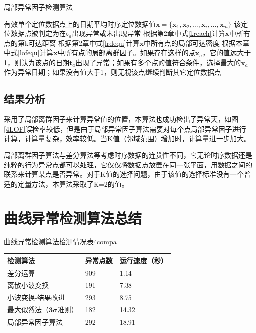 \documentclass[a4paper,AutoFakeBold,oneside,12pt]{book}
\begin{document}
\begin{algorithm} 
\caption{局部异常因子检测算法} 
\label{a44}
\renewcommand{\algorithmicrequire}{\textbf{输入：}}
\renewcommand{\algorithmicensure}{\textbf{输出：}} 
\begin{algorithmic}[1] 
\Require 有效单个定位数据点上的日期平均时序定位数据值$\bm{x}=\{\bm{x}_1,\bm{x}_2,\ldots,\bm{x}_i,\ldots,\bm{x}_m\}$
\Ensure 该定位数据点被判定为在$\bm{t}_a$出现异常或未出现异常
\State  根据第2章中式\ref{kreach}计算$\bm{x}$中所有点的第k可达距离
\State  根据第2章中式\ref{lrdequ}计算$\bm{x}$中所有点的局部可达密度
\State 根据本章中式\ref{lofequ}计算$\bm{x}$中所有点的局部离群因子。如果存在这样的点$\bm{x}_a$，它的值远大于1，则认为该点的日期$\bm{t}_a$出现了异常；如果有多个点的值符合条件，选择最大的$\bm{x}_a$作为异常日期；如果没有值大于1，则无视该点继续判断其它定位数据点
\end{algorithmic}  
\end{algorithm}


\subsection{结果分析}
采用了局部离群因子来计算异常值的位置，本算法也成功检出了异常天，如图\ref{4LOF}误检率较低，但是由于局部异常因子算法需要对每个点局部异常因子进行计算，计算量复杂，效率较低。当K值（邻域范围）增加时，计算量进一步加大。


局部离群因子算法与差分算法等考虑时序数据的连贯性不同，它无论时序数据还是纯粹的行为异常点都可以处理，它仅仅将数据点放置在同一张平面，用数据之间的联系来计算某点是否异常。对于K值的选择问题，由于该值的选择标准没有一个普适的定量方法，本算法采取了K=2的值\cite{KNNK}。


\section{曲线异常检测算法总结}


\begin{bupttable}{曲线异常检测算法检测情况表}{4compa}
    \begin{tabular}{l|l|l}
		\hline \textbf{检测算法} & \textbf{异常点数}  & \textbf{运行速度（秒）} \\
		\hline 差分运算 & 909 & 1.14\\
		\hline 离散小波变换 & 191 & 7.38 \\
		\hline 小波变换-结果改进 & 293 & 8.75 \\
		\hline 最大似然法（$\bm{3\sigma}$准则） & 182 & 14.32\\
		\hline 局部异常因子算法 & 292  & 18.91\\
		\hline
    \end{tabular}
\end{bupttable}
\end{document}

